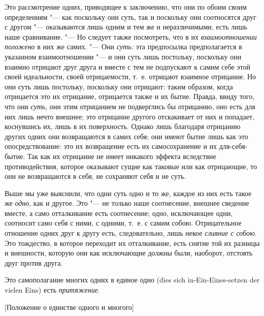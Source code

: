 Это рассмотрение одних, приводящее к заключению, что они по обоим своим
определениям "--- как поскольку они суть, так и поскольку они соотносятся друг
с другом "--- оказываются лишь одним и тем же и неразличимыми, есть лишь наше
сравнивание. "--- Но следует также посмотреть, что в их
{\em взаимоотношении положено} в них же самих. "--- Они
{\em суть:} эта предпосылка предполагается в указанном
взаимоотношении "--- и они суть лишь постольку, поскольку они взаимно отрицают
друг друга и вместе с тем не подпускают к самим себе этой своей
идеальности, своей отрицаемости, т.~е. отрицают взаимное отрицание. Но они
суть лишь постольку, поскольку они отрицают: таким образом, когда
отрицается это их отрицание, отрицается также и их бытие. Правда, ввиду
того, что они {\em суть}, они этим отрицанием не
подверглись бы отрицанию, оно есть для них лишь нечто внешнее; это
отрицание другого отскакивает от них и попадает, коснувшись их, лишь в их
поверхность. Однако лишь благодаря отрицанию других одних они возвращаются
в самих себя; они имеют бытие лишь как это опосредствование: это их
возвращение есть их самосохранение и их для-себя-бытие. Так как их
отрицание не имеет никакого эффекта вследствие противодействия, которое
оказывают сущие как таковые или как отрицающие, то они не возвращаются в
себя, не сохраняют себя и не суть.

Выше мы уже выяснили, что одни суть одно и то же, каждое из них есть такое
же {\em одно}, как и другое. Это "--- не только наше
соотнесение, внешнее сведение вместе, а само отталкивание есть соотнесение;
одно, исключающее одни, соотносит само себя с ними, с одними, т.~е. с самим
собою. Отрицательное отношение одних друг к другу есть, следовательно, лишь
некое {\em слияние с собою}. Это тождество, в которое
переходит их отталкивание, есть снятие той их разницы и внешности, которую
они как исключающие должны были, наоборот, отстоять друг против друга.

Это самополагание многих одних в единое одно (dies sich
in-Ein-Eines-setzen der vielen Eins) есть {\em притяжение}.

%
{[Положение о единстве одного и многого]}

